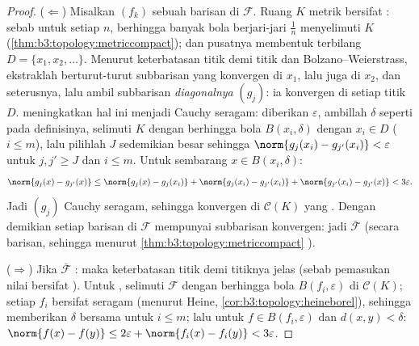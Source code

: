 \begin{proof}
($\Leftarrow$) Misalkan $(f_k)$ sebuah barisan di $\mathcal F$. Ruang $K$
metrik  bersifat \emph{}: sebab untuk setiap $n$, berhingga banyak
bola berjari-jari $\frac1n$ menyelimuti $K$
(\cref{thm:b3:topology:metriccompact}); dan pusatnya membentuk
 terbilang $D = \{x_1, x_2, \dots\}$. Menurut keterbatasan titik demi
titik dan Bolzano--Weierstrass, ekstraklah berturut-turut
subbarisan yang konvergen di $x_1$, lalu juga di $x_2$, dan seterusnya, lalu
ambil subbarisan \emph{diagonalnya} $(g_j)$: ia konvergen di
setiap titik $D$.  meningkatkan hal ini menjadi Cauchy
seragam: diberikan $\varepsilon$, ambillah $\delta$ seperti pada
definisinya, selimuti $K$ dengan berhingga bola $B(x_i, \delta)$
dengan $x_i \in D$ ($i \leq m$), lalu pilihlah $J$ sedemikian besar sehingga
$\norm{g_j(x_i) - g_{j'}(x_i)} < \varepsilon$ untuk $j, j' \geq
J$ dan $i \leq m$. Untuk sembarang $x \in B(x_i, \delta)$:
\[
\norm{g_j(x) - g_{j'}(x)}
\leq \norm{g_j(x) - g_j(x_i)} + \norm{g_j(x_i) - g_{j'}(x_i)}
+ \norm{g_{j'}(x_i) - g_{j'}(x)} < 3\varepsilon .
\]
Jadi $(g_j)$ Cauchy seragam, sehingga konvergen di
$\mathcal C(K)$ yang . Dengan demikian setiap barisan di $\mathcal F$ mempunyai
subbarisan konvergen: jadi $\bar{\mathcal F}$  (secara barisan,
sehingga menurut \cref{thm:b3:topology:metriccompact} ).

($\Rightarrow$) Jika $\bar{\mathcal F}$ : maka keterbatasan titik demi
titiknya jelas (sebab pemasukan nilai bersifat ). Untuk
, selimuti $\mathcal F$ dengan berhingga bola
$B(f_i, \varepsilon)$ di $\mathcal C(K)$; setiap $f_i$ bersifat
 seragam (menurut Heine,
\cref{cor:b3:topology:heineborel}), sehingga memberikan $\delta$ bersama
untuk $i \leq m$; lalu untuk $f \in B(f_i, \varepsilon)$ dan $d(x,y)
< \delta$: $\norm{f(x)-f(y)} \leq 2\varepsilon +
\norm{f_i(x)-f_i(y)} < 3\varepsilon$.
\end{proof}

